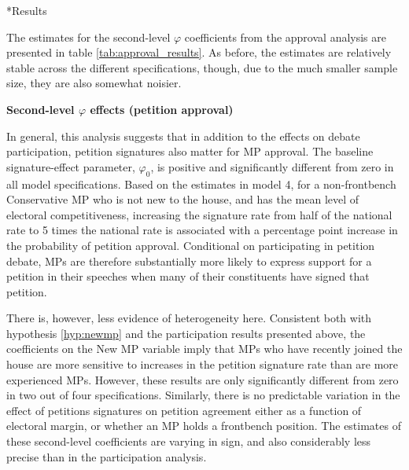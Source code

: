 \documentclass[12pt]{article}
\makeatletter
\renewcommand{\subsection}{\@startsection{subsection}{2}{0mm}{-\baselineskip}{0.25\baselineskip}{\raggedright\normalfont\normalsize\scshape}}
\makeatother
\begin{document}
\subsection*{Results}

The estimates for the second-level $\varphi$ coefficients from the approval analysis are presented in table \ref{tab:approval_results}. As before, the estimates are relatively stable across the different specifications, though, due to the much smaller sample size, they are also somewhat noisier.



\begin{table}
\begin{center}


\end{center}
\caption{\label{tab:approval_results}\textbf{Second-level $\varphi$ effects (petition approval)} }

\end{table}



In general, this analysis suggests that in addition to the effects on debate participation, petition signatures also matter for MP approval. The baseline signature-effect parameter, $\varphi_0$, is positive and significantly different from zero in all model specifications. Based on the estimates in model 4, for a non-frontbench Conservative MP who is not new to the house, and has the mean level of electoral competitiveness, increasing the signature rate from half of the national rate to 5 times the national rate is associated with a percentage point increase in the probability of petition approval. Conditional on participating in petition debate, MPs are therefore substantially more likely to express support for a petition in their speeches when many of their constituents have signed that petition. 

There is, however, less evidence of heterogeneity here. Consistent both with hypothesis \ref{hyp:newmp} and the participation results presented above, the coefficients on the New MP variable imply that MPs who have recently joined the house are more sensitive to increases in the petition signature rate than are more experienced MPs. However, these results are only significantly different from zero in two out of four specifications. Similarly, there is no predictable variation in the effect of petitions signatures on petition agreement either as a function of electoral margin, or whether an MP holds a frontbench position. The estimates of these second-level coefficients are varying in sign, and also considerably less precise than in the participation analysis. 
\end{document}
